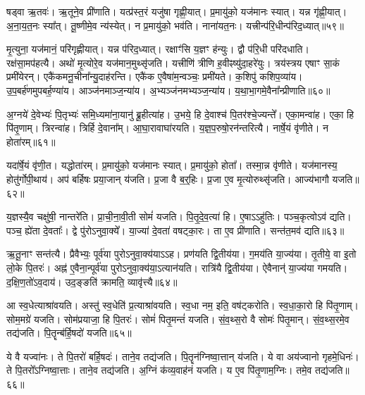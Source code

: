 षड्वा ऋ॒तवः॑।
ऋ॒तूने॒व प्री॑णाति।
यत्प्र॑स्त॒रं यजु॑षा गृह्णी॒यात्।
प्र॒मायु॑को॒ यज॑मानः स्यात्।
यन्न गृ॑ह्णी॒यात्।
अ॒ना॒य॒त॒नः स्या᳚त्।
तू॒ष्णीमे॒व न्य॑स्येत्।
न प्र॒मायु॑को॒ भव॑ति।
नाना॑यत॒नः।
यत्त्रीन्प॑रि॒धीन्प॑रिद॒ध्यात्॥५९॥\ip

मृ॒त्युना॒ यज॑मानं॒ परि॑गृह्णीयात्।
यन्न प॑रिद॒ध्यात्।
रक्षाꣳ॑सि य॒ज्ञꣳ ह॑न्युः।
द्वौ प॑रि॒धी परि॑दधाति।
रक्ष॑सा॒मप॑हत्यै।
अथो॑ मृ॒त्योरे॒व यज॑मान॒मुथ्सृ॑जति।
यत्त्रीणि॑ त्रीणि ह॒वीꣴष्यु॑दा॒हरे॑युः।
त्रय॑स्त्रय एषाꣳ सा॒कं प्रमी॑येरन्।
एकै॑कमनू॒चीना᳚न्यु॒दाह॑रन्ति।
एकै॑क ए॒वैषा॑म॒न्वञ्चः॒ प्रमी॑यते।
क॒शिपु॑ कशिप॒व्या॑य।
उ॒प॒बर्\mbox{}ह॑णमुपबर्\mbox{}ह॒ण्या॑य।
आञ्ज॑नमाञ्ज॒न्या॑य।
अ॒भ्यञ्ज॑नमभ्यञ्ज॒न्या॑य।
य॒था॒भा॒गमे॒\-वैना᳚न्प्रीणाति॥६०॥\ip{}

अ॒ग्नये॑ दे॒वेभ्यः॑ पि॒तृभ्यः॑ समि॒ध्यमा॑ना॒यानु॑ ब्रू॒हीत्या॑ह।
उ॒भये॒ हि दे॒वाश्च॑ पि॒तर॑श्चे॒ज्यन्ते᳚।
एका॒मन्वा॑ह।
एका॒ हि पि॑तृ॒णाम्।
त्रिरन्वा॑ह।
त्रिर्\mbox{}हि दे॒वाना᳚म्।
आ॒घा॒रावाघा॑रयति।
य॒ज्ञ॒प॒रुषो॒रन॑न्तरित्यै।
नार्\mbox{}षे॒यं वृ॑णीते।
न होता॑रम्॥६१॥\ip

यदा॑र्\mbox{}षे॒यं वृ॑णी॒त।
यद्धोता॑रम्।
प्र॒मायु॑को॒ यज॑मानः स्यात्।
प्र॒मायु॑को॒ होता᳚।
तस्मा॒न्न वृ॑णीते।
यज॑मानस्य॒ होतु॑र्गोपी॒थाय॑।
अप॑ बर्\mbox{}हिषः प्रया॒जान् य॑जति।
प्र॒जा वै ब॒र्॒हिः।
प्र॒जा ए॒व मृ॒त्योरुथ्सृ॑जति।
आज्य॑\-भागौ यजति॥६२॥\ip

य॒ज्ञस्यै॒व चक्षु॑षी॒ नान्तरे॑ति।
प्रा॒ची॒ना॒वी॒ती सोमं॑ यजति।
पि॒तृ॒दे॒व॒त्या॑ हि।
ए॒षाऽऽहु॑तिः।
पञ्च॒कृत्वोऽव॑ द्यति।
पञ्च॒ ह्ये॑ता दे॒वताः᳚।
द्वे पु॑रो\-ऽनुवा॒क्ये᳚।
या॒ज्या॑ दे॒वता॑ वषट्का॒रः।
ता ए॒व प्री॑णाति।
सन्त॑त॒मव॑ द्यति॥६३॥\ip

ऋ॒तू॒नाꣳ सन्त॑त्यै।
प्रैवैभ्यः॒ पूर्व॑या पुरो\-ऽनुवा॒क्य॑याऽऽह।
प्रण॑यति द्वि॒तीय॑या।
ग॒मय॑ति या॒ज्य॑या।
तृ॒तीये॒ वा इ॒तो लो॒के पि॒तरः॑।
अह्न॑ ए॒वैना॒न्पूर्व॑या पुरो\-ऽनुवा॒क्य॑या॒\-ऽत्यान॑यति।
रात्रि॑यै द्वि॒तीय॑या।
ऐवैनान्॑ या॒ज्य॑या गमयति।
द॒क्षि॒ण॒तो॑\-ऽव॒दाय॑।
उद॒ङ्ङति॑ क्रामति॒ व्यावृ॑त्त्यै॥६४॥\ip

आ स्व॒धेत्याश्रा॑वयति।
अस्तु॑ स्व॒धेति॑ प्र॒त्याश्रा॑वयति।
स्व॒धा नम॒ इति॒ वष॑ट्करोति।
स्व॒धा॒का॒रो हि पि॑तृ॒णाम्।
सोम॒मग्रे॑ यजति।
सोम॑प्रयाजा॒ हि पि॒तरः॑।
सोमं॑ पितृ॒मन्तं॑ यजति।
सं॒व॒थ्स॒रो वै सोमः॑ पितृ॒मान्।
सं॒व॒थ्स॒रमे॒व तद्य॑जति।
पि॒तॄन्ब॑र्हि॒षदो॑ यजति॥६५॥\ip

ये वै यज्वा॑नः।
ते पि॒तरो॑ बर्\mbox{}हि॒षदः॑।
ताने॒व तद्य॑जति।
पि॒तॄन॑ग्निष्वा॒त्तान् य॑जति।
ये वा अय॑ज्वानो गृहमे॒धिनः॑।
ते पि॒तरो᳚\-ऽग्निष्वा॒त्ताः।
ताने॒व तद्य॑जति।
अ॒ग्निं क॑व्य॒वाह॑नं यजति।
य ए॒व पि॑तृ॒णाम॒ग्निः।
तमे॒व तद्य॑जति॥६६॥\ip

